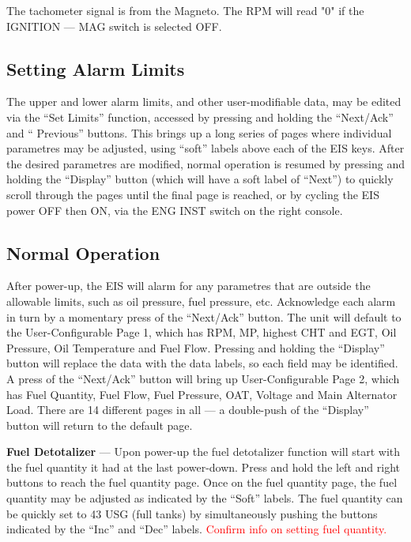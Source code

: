 \begin{Note}
The tachometer signal is from the Magneto. The RPM will read "0" if the IGNITION --- MAG switch is selected OFF. 
\end{Note}

\subsection*{Setting Alarm Limits}
The upper and lower alarm limits, and other user-modifiable data, may be edited via the ``Set Limits'' function, accessed by pressing and holding the ``Next/Ack'' and `` Previous'' buttons. This brings up a long series of pages where individual parametres may be adjusted, using ``soft'' labels above each of the EIS keys. After the desired parametres are modified, normal operation is resumed by pressing and holding the ``Display'' button (which will have a soft label of ``Next'') to quickly scroll through the pages until the final page is reached, or by cycling the EIS power OFF then ON, via the ENG INST switch on the right console.

\subsection*{Normal Operation}

After power-up, the EIS will alarm for any parametres that are outside the allowable limits, such as oil pressure, fuel pressure, etc. Acknowledge each alarm in turn by a momentary press of the ``Next/Ack'' button. The unit will default to the User-Configurable Page 1, which has RPM, MP, highest CHT and EGT, Oil Pressure, Oil Temperature and Fuel Flow. Pressing and holding the ``Display'' button will replace the data with the data labels, so each field may be identified. A press of the ``Next/Ack'' button will bring up User-Configurable Page 2, which has Fuel Quantity, Fuel Flow, Fuel Pressure, OAT, Voltage and Main Alternator Load. There are 14 different pages in all --- a double-push of the ``Display'' button will return to the default page.

\textbf{Fuel Detotalizer} --- Upon power-up the fuel detotalizer function will start with the fuel quantity it had at the last power-down.  Press and hold the left and right buttons to reach the fuel quantity page.  Once on the fuel quantity page, the fuel quantity may be adjusted as indicated by the ``Soft'' labels.  The fuel quantity can be quickly set to 43 USG (full tanks) by simultaneously pushing the buttons indicated by the ``Inc'' and ``Dec'' labels.  \textcolor{red}{Confirm info on setting fuel quantity.}

